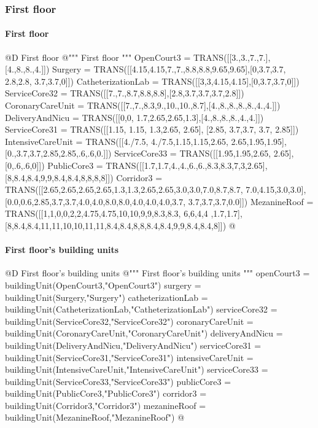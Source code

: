 \documentclass[11pt,oneside]{article}    %
\begin{document}
\subsubsection{First floor}
\paragraph{First floor}
@D First floor
@{""" First floor """
OpenCourt3 = TRANS([[3.,3.,7.,7.],[4.,8.,8.,4.]])
Surgery = TRANS([[4.15,4.15,7.,7.,8.8,8.8,9.65,9.65],[0,3.7,3.7, 2.8,2.8, 3.7,3.7,0]])
CatheterizationLab = TRANS([[3,3,4.15,4.15],[0,3.7,3.7,0]])
ServiceCore32 = TRANS([[7.,7.,8.7,8.8,8.8],[2.8,3.7,3.7,3.7,2.8]])
CoronaryCareUnit = TRANS([[7.,7.,8.3,9.,10.,10.,8.7],[4.,8.,8.,8.,8.,4.,4.]])
DeliveryAndNicu = TRANS([[0,0, 1.7,2.65,2.65,1.3],[4.,8.,8.,8.,4.,4.]])
ServiceCore31 = TRANS([[1.15, 1.15, 1.3,2.65, 2.65], [2.85, 3.7,3.7, 3.7, 2.85]])
IntensiveCareUnit = TRANS([[4./7.5, 4./7.5,1.15,1.15,2.65, 2.65,1.95,1.95],
    [0.,3.7,3.7,2.85,2.85,.6,.6,0.]])
ServiceCore33 = TRANS([[1.95,1.95,2.65, 2.65],[0,.6,.6,0]])
PublicCore3 = TRANS([[1.7,1.7,4.,4.,6.,6.,8.3,8.3,7,3,2.65],
    [8,8.4,8.4,9,9,8.4,8.4,8,8,8,8]])
Corridor3 = TRANS([[2.65,2.65,2.65,2.65,1.3,1.3,2.65,2.65,3.0,3.0,7.0,8.7,8.7,
    7.0,4.15,3.0,3.0],[0.0,0.6,2.85,3.7,3.7,4.0,4.0,8.0,8.0,4.0,4.0,4.0,3.7,
    3.7,3.7,3.7,0.0]])
MezanineRoof = TRANS([[1,1,0,0,2,2,4.75,4.75,10,10,9,9,8.3,8.3, 6,6,4,4 ,1.7,1.7],
    [8,8.4,8.4,11,11,10,10,11,11,8.4,8.4,8,8,8.4,8.4,9,9,8.4,8.4,8]])
@}

\paragraph{First floor's building units}
@D First floor's building units 
@{""" First floor's building units """
openCourt3 = buildingUnit(OpenCourt3,"OpenCourt3")
surgery = buildingUnit(Surgery,"Surgery")
catheterizationLab = buildingUnit(CatheterizationLab,"CatheterizationLab")
serviceCore32 = buildingUnit(ServiceCore32,"ServiceCore32")
coronaryCareUnit = buildingUnit(CoronaryCareUnit,"CoronaryCareUnit")
deliveryAndNicu = buildingUnit(DeliveryAndNicu,"DeliveryAndNicu")
serviceCore31 = buildingUnit(ServiceCore31,"ServiceCore31")
intensiveCareUnit = buildingUnit(IntensiveCareUnit,"IntensiveCareUnit")
serviceCore33 = buildingUnit(ServiceCore33,"ServiceCore33")
publicCore3 = buildingUnit(PublicCore3,"PublicCore3")
corridor3 = buildingUnit(Corridor3,"Corridor3")
mezanineRoof = buildingUnit(MezanineRoof,"MezanineRoof")
@}
\end{document}
